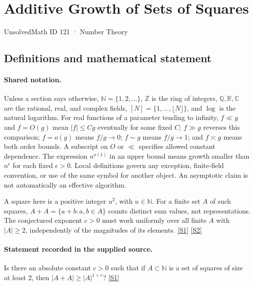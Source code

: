 \documentclass[11pt,a4paper]{article}
\newcommand{\N}{\mathbb{N}}
\newcommand{\Z}{\mathbb{Z}}
\newcommand{\Q}{\mathbb{Q}}
\newcommand{\R}{\mathbb{R}}
\newcommand{\C}{\mathbb{C}}
\newcommand{\sref}[2]{\hyperlink{source:#1:#2}{[S#2]}}
\begin{document}

\setcounter{section}{120}

\section{Additive Growth of Sets of Squares}\label{121}

{\small\sffamily UnsolvedMath ID 121 · Number Theory}

\subsection{Definitions and mathematical statement}

\paragraph{Shared notation.}Unless a section says otherwise, $\N=\{1,2,\ldots\}$,
$\Z$ is the ring of integers, $\Q,\R,\C$ are the rational, real, and complex
fields, $[N]=\{1,\ldots,\lfloor N\rfloor\}$, and $\log$ is the natural
logarithm. For real functions of a parameter tending to infinity,
$f\ll g$ and $f=O(g)$ mean $|f|\leq Cg$ eventually for some fixed $C$;
$f\gg g$ reverses this comparison; $f=o(g)$ means $f/g\to0$;
$f\sim g$ means $f/g\to1$; and $f\asymp g$ means both order bounds.
A subscript on $O$ or $\ll$ specifies allowed constant dependence.
The expression $n^{o(1)}$ in an upper bound means growth smaller than
$n^\epsilon$ for each fixed $\epsilon>0$. Local definitions govern any
exception, finite-field convention, or use of the same symbol for another
object. An asymptotic claim is not automatically an effective algorithm.



A square here is a positive integer $u^2$, with $u\in\N$. For a finite set $A$ of such squares, $A+A=\{a+b:a,b\in A\}$ counts distinct sum values, not representations. The conjectured exponent $c>0$ must work uniformly over all finite $A$ with $|A|\geq2$, independently of the magnitudes of its elements. \sref{121}{1} \sref{121}{2}

\paragraph{Statement recorded in the supplied source.}
Is there an absolute constant $c > 0$ such that if $A \subset \mathbb{N}$ is a set of squares of size at least 2, then $|A + A| \geq |A|^{1+c}$? \sref{121}{1}
\end{document}
